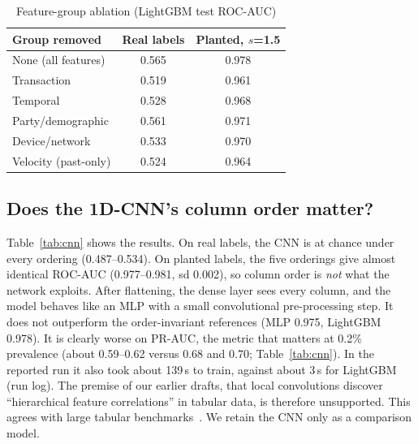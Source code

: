 \documentclass[conference]{IEEEtran}
\begin{document}
\begin{table}[t]
\centering
\caption{Feature-group ablation (LightGBM test ROC-AUC)}\label{tab:abl}
\footnotesize
\begin{tabular}{@{}lcc@{}}
\toprule
Group removed & Real labels & Planted, $s$=1.5 \\
\midrule
None (all features) & 0.565 & 0.978 \\
Transaction & 0.519 & 0.961 \\
Temporal & 0.528 & 0.968 \\
Party/demographic & 0.561 & 0.971 \\
Device/network & 0.533 & 0.970 \\
Velocity (past-only) & 0.524 & 0.964 \\
\bottomrule
\end{tabular}
\end{table}

\subsection{Does the 1D-CNN's column order matter?}
Table~\ref{tab:cnn} shows the results. On real labels, the CNN is at chance under every ordering (0.487--0.534). On planted labels, the five orderings give almost identical ROC-AUC (0.977--0.981, sd 0.002), so column order is \emph{not} what the network exploits. After flattening, the dense layer sees every column, and the model behaves like an MLP with a small convolutional pre-processing step. It does not outperform the order-invariant references (MLP 0.975, LightGBM 0.978). It is clearly worse on PR-AUC, the metric that matters at 0.2\% prevalence (about 0.59--0.62 versus 0.68 and 0.70; Table~\ref{tab:cnn}). In the reported run it also took about 139\,s to train, against about 3\,s for LightGBM (run log). The premise of our earlier drafts, that local convolutions discover ``hierarchical feature correlations'' in tabular data, is therefore unsupported. This agrees with large tabular benchmarks~\cite{grinsztajn2022,shwartz2022}. We retain the CNN only as a comparison model.
\end{document}
